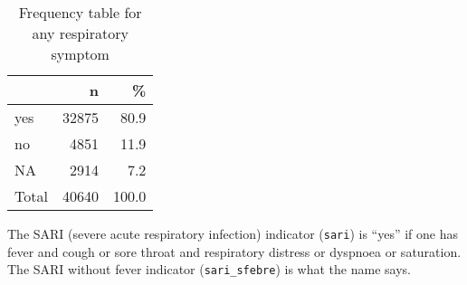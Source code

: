 \documentclass[
]{article}
\newenvironment{Shaded}{\begin{snugshade}}{\end{snugshade}}
\newcommand{\DataTypeTok}[1]{\textcolor[rgb]{0.13,0.29,0.53}{#1}}
\newcommand{\DecValTok}[1]{\textcolor[rgb]{0.00,0.00,0.81}{#1}}
\newcommand{\KeywordTok}[1]{\textcolor[rgb]{0.13,0.29,0.53}{\textbf{#1}}}
\newcommand{\NormalTok}[1]{#1}
\newcommand{\OperatorTok}[1]{\textcolor[rgb]{0.81,0.36,0.00}{\textbf{#1}}}
\newcommand{\OtherTok}[1]{\textcolor[rgb]{0.56,0.35,0.01}{#1}}
\newcommand{\StringTok}[1]{\textcolor[rgb]{0.31,0.60,0.02}{#1}}
\begin{document}
\begin{Shaded}
\end{Shaded}

\begin{table}[!h]

\caption{\label{tab:unnamed-chunk-77}Frequency table for any respiratory symptom}
\centering
\begin{tabular}[t]{l|r|r}
\hline
  & n & \%\\
\hline
yes & 32875 & 80.9\\
\hline
no & 4851 & 11.9\\
\hline
NA & 2914 & 7.2\\
\hline
Total & 40640 & 100.0\\
\hline
\end{tabular}
\end{table}

The SARI (severe acute respiratory infection) indicator (\texttt{sari})
is ``yes'' if one has fever and cough or sore throat and respiratory
distress or dyspnoea or saturation. The SARI without fever indicator
(\texttt{sari\_sfebre}) is what the name says.
\end{document}
